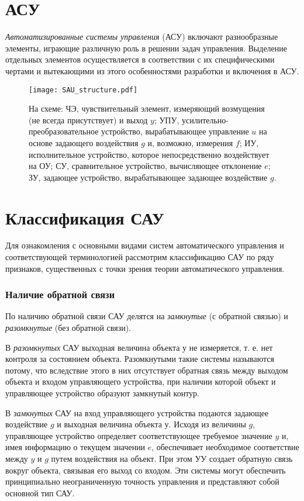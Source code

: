 \documentclass[../../TAU.tex]{subfiles}
\begin{document}
\section{АСУ}

    {\it Автоматизированные системы управления} (АСУ) включают разнообразные элементы, играющие различную роль в решении задач управления. Выделение отдельных элементов осуществляется в соответствии с их специфическими чертами и вытекающими из этого особенностями разработки и включения в АСУ. 

    \begin{figure}[h]
    \centering
    \texttt{[image: SAU\_structure.pdf]}
    \caption{На схеме: 
    ЧЭ, чувствительный элемент, измеряющий возмущения (не всегда присутствует)
     и выход $y$; УПУ, усилительно-преобразовательное устройство, вырабатывающее управление $u$ на основе задающего воздействия $g$ и, возможно, измерения $f$; ИУ, исполнительное устройство, которое непосредственно воздействует на ОУ; СУ, сравнительное устройство, вычисляющее отклонение $e$; ЗУ, задающее устройство, вырабатывающее задающее воздействие $g$.}
    \centering
    \end{figure}


\section{Классификация САУ}
    Для ознакомления с основными видами систем автоматического управления и соответствующей терминологией рассмотрим классификацию САУ по ряду признаков, существенных с точки зрения теории автоматического управления. 

\subsubsection{Наличие обратной связи \cite[стр. 14]{kim:uch}}
    По наличию обратной связи САУ делятся на {\it замкнутые} (с обратной связью) и {\it разомкнутые} (без обратной связи).\par
    В {\it разомкнутых} САУ выходная величина объекта у не измеряется, т. е. нет контроля за состоянием объекта. Разомкнутыми такие системы называются потому, что вследствие этого в них отсутствует обратная связь между выходом объекта и входом управляющего устройства, при наличии которой объект и управляющее устройство образуют замкнутый контур. \par
    В {\it замкнутых} САУ на вход управляющего устройства подаются задающее воздействие $g$ и выходная величина объекта $у$. Исходя из величины $g$, управляющее устройство определяет соответствующее требуемое значение $y$ и, имея информацию о текущем значении $e$, обеспечивает необходимое соответствие между $y$ и $g$ путем воздействия на объект. При этом УУ создает обратную связь вокруг объекта, связывая его выход со входом. Эти системы могут обеспечить принципиально неограниченную точность управления и представляют собой основной тип САУ. 
\end{document}
